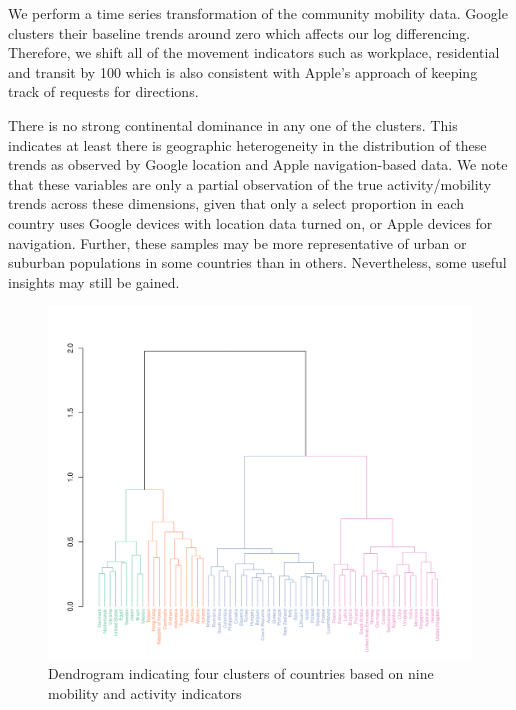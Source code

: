\documentclass[preprint, 11pt]{elsarticle}
\newcommand{\?}{\stackrel{?}{=}}
\begin{document}
We perform a time series transformation of the community mobility data. Google clusters their baseline trends around zero which affects our log differencing.
Therefore, we shift all of the movement indicators such as workplace, residential and transit by 100 which is also consistent with Apple's approach of keeping track of requests for directions.

There is no strong continental dominance in any one of the clusters.
This indicates at least there is geographic heterogeneity in the distribution of these trends as observed by Google location and Apple navigation-based data.
We note that these variables are only a partial observation of the true activity/mobility trends across these dimensions, given that only a select proportion in each country uses Google devices with location data turned on, or Apple devices for navigation.
Further, these samples may be more representative of urban or suburban populations in some countries than in others.
Nevertheless, some useful insights may still be gained.

\begin{figure}[h!]
  \includegraphics[width=\textwidth,trim={0cm 0 1.9cm 7cm},clip]{dendrogram}
  \caption{Dendrogram indicating four clusters of countries based on nine mobility and activity indicators}
  \label{fig:dend}
\end{figure}
\end{document}
